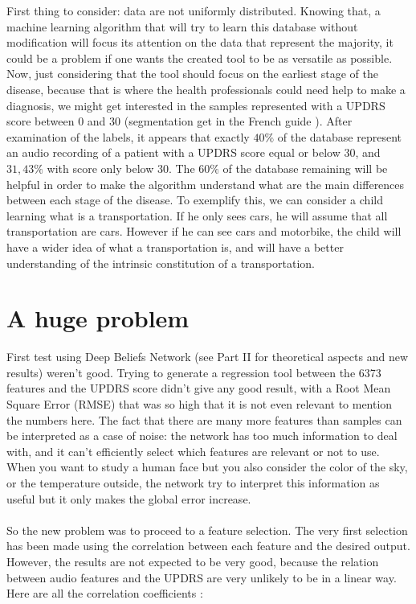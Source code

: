 \documentclass{report}
\begin{document}
	
	First thing to consider: data are not uniformly distributed. Knowing that, a machine learning algorithm that will try to learn this database without modification will focus its attention on the data that represent the majority, it could be a problem if one wants the created tool to be as versatile as possible. Now, just considering that the tool should focus on the earliest stage of the disease, because that is where the health professionals could need help to make a diagnosis, we might get interested in the samples represented with a UPDRS score between 0 and 30 (segmentation get in the French guide \cite{updrsguide}). After examination of the labels, it appears that exactly $40\%$ of the database represent an audio recording of a patient with a UPDRS score equal or below $30$, and $31,43\%$ with score only below $30$. The $60\%$ of the database remaining will be helpful in order to make the algorithm understand what are the main differences between each stage of the disease. To exemplify this, we can consider a child learning what is a transportation. If he only sees cars, he will assume that all transportation are cars. However if he can see cars and motorbike, the child will have a wider idea of what a transportation is, and will have a better understanding of the intrinsic constitution of a transportation.
	
	\section{A huge problem}
	
	First test using Deep Beliefs Network (see Part II for theoretical aspects and new results) weren't good. Trying to generate a regression tool between the 6373 features and the UPDRS score didn't give any good result, with a Root Mean Square Error (RMSE) that was so high that it is not even relevant to mention the numbers here. The fact that there are many more features than samples can be interpreted as a case of noise: the network has too much information to deal with, and it can't efficiently select which features are relevant or not to use. When you want to study a human face but you also consider the color of the sky, or the temperature outside, the network try to interpret this information as useful but it only makes the global error increase.\\\\
	So the new problem was to proceed to a feature selection. The very first selection has been made using the correlation between each feature and the desired output. However, the results are not expected to be very good, because the relation between audio features and the UPDRS are very unlikely to be in a linear way. Here are all the correlation coefficients :
	\\
	
\end{document}
